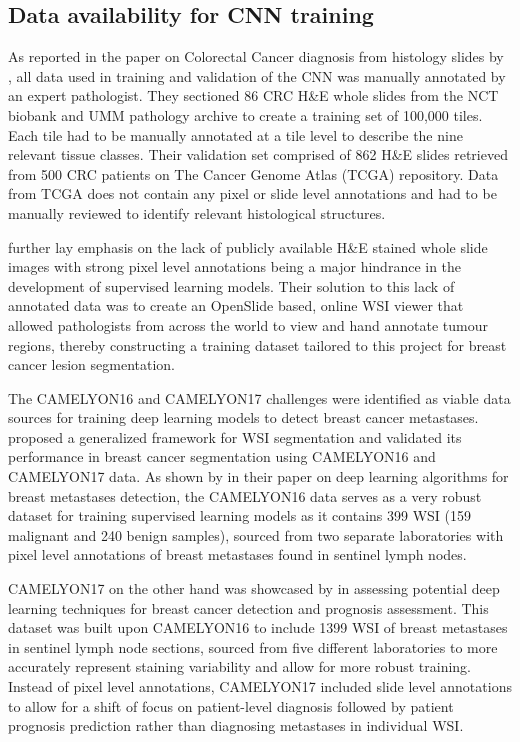 \documentclass{l4proj}
\begin{document}
\subsection{Data availability for CNN training} \label{data-availability-section}
As reported in the paper on Colorectal Cancer diagnosis from histology slides by \cite{Kather2019}, all data used in training and validation of the CNN was manually annotated by an expert pathologist. They sectioned 86 CRC H\&E whole slides from the NCT biobank and UMM pathology archive to create a training set of 100,000 tiles. Each tile had to be manually annotated at a tile level to describe the nine relevant tissue classes. Their validation set comprised of 862 H\&E slides retrieved from 500 CRC patients on The Cancer Genome Atlas (TCGA) repository. Data from TCGA does not contain any pixel or slide level annotations and had to be manually reviewed to identify relevant histological structures. 

\cite{priego2020automatic} further lay emphasis on the lack of publicly available H\&E stained whole slide images with strong pixel level annotations being a major hindrance in the development of supervised learning models. Their solution to this lack of annotated data was to create an OpenSlide based, online WSI viewer that allowed pathologists from across the world to view and hand annotate tumour regions, thereby constructing a training dataset tailored to this project for breast cancer lesion segmentation.

The CAMELYON16 and CAMELYON17 challenges were identified as viable data sources for training deep learning models to detect breast cancer metastases. \cite{Khened2021} proposed a generalized framework for WSI segmentation and validated its performance in breast cancer segmentation using CAMELYON16 and CAMELYON17 data. As shown by \cite{bejnordi2017diagnostic} in their paper on deep learning algorithms for breast metastases detection, the CAMELYON16 data serves as a very robust dataset for training supervised learning models as it contains 399 WSI (159 malignant and 240 benign samples), sourced from two separate laboratories with pixel level annotations of breast metastases found in sentinel lymph nodes. 

CAMELYON17 on the other hand was showcased by \cite{bandi2018detection} in assessing potential deep learning techniques for breast cancer detection and prognosis assessment. This dataset was built upon CAMELYON16 to include 1399 WSI of breast metastases in sentinel lymph node sections, sourced from five different laboratories to more accurately represent staining variability and allow for more robust training. Instead of pixel level annotations, CAMELYON17 included slide level annotations to allow for a shift of focus on patient-level diagnosis followed by patient prognosis prediction rather than diagnosing metastases in individual WSI. 
\\
\end{document}
